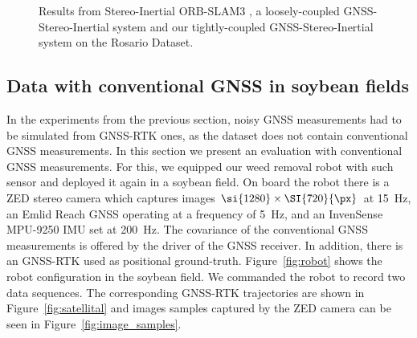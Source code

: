 \begin{figure}[!htp]
  \hspace{1cm}
  \caption{Results from Stereo-Inertial ORB-SLAM3 \cite{campos2021orbslam3}, a loosely-coupled GNSS-Stereo-Inertial system \cite{qin2019general} and our tightly-coupled GNSS-Stereo-Inertial system on the Rosario Dataset.}
  \label{fig:trajectories_rosario}
\end{figure}

\subsection{Data with conventional GNSS in soybean fields}
\label{sec:experiments_conventional_gps}
In the experiments from the previous section, noisy GNSS measurements had to be simulated from GNSS-RTK ones, as the dataset does not contain conventional GNSS measurements. In this section we present an evaluation with conventional GNSS measurements. For this, we equipped our weed removal robot with such sensor and deployed it again in a soybean field. On board the robot there is a ZED stereo camera which captures images $\si{1280}\times\SI{720}{\px}$ at \SI{15}{\hertz}, an Emlid Reach GNSS operating at a frequency of \SI{5}{\hertz}, and an InvenSense MPU-9250 IMU set at \SI{200}{\hertz}. The covariance of the conventional GNSS measurements is offered by the driver of the GNSS receiver. In addition, there is an GNSS-RTK used as positional ground-truth. Figure~\ref{fig:robot} shows the robot configuration in the soybean field. We commanded the robot to record two data sequences. The corresponding GNSS-RTK trajectories are shown in Figure~\ref{fig:satellital} and images samples captured by the ZED camera can be seen in Figure~\ref{fig:image_samples}.

